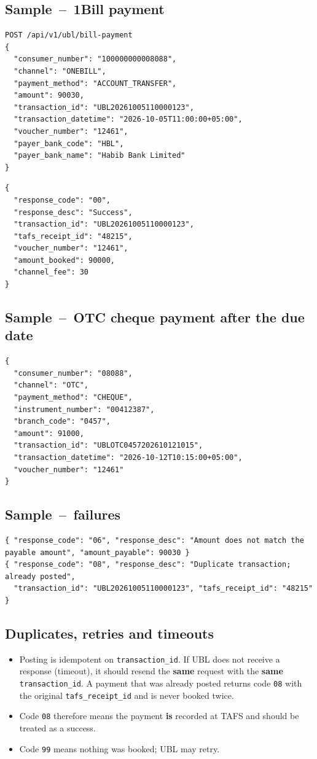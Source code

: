 \documentclass[11pt]{article}
\begin{document}
\subsection{Sample \,--\, 1Bill payment}
\begin{lstlisting}
POST /api/v1/ubl/bill-payment
{
  "consumer_number": "100000000008088",
  "channel": "ONEBILL",
  "payment_method": "ACCOUNT_TRANSFER",
  "amount": 90030,
  "transaction_id": "UBL20261005110000123",
  "transaction_datetime": "2026-10-05T11:00:00+05:00",
  "voucher_number": "12461",
  "payer_bank_code": "HBL",
  "payer_bank_name": "Habib Bank Limited"
}
\end{lstlisting}
\begin{lstlisting}
{
  "response_code": "00",
  "response_desc": "Success",
  "transaction_id": "UBL20261005110000123",
  "tafs_receipt_id": "48215",
  "voucher_number": "12461",
  "amount_booked": 90000,
  "channel_fee": 30
}
\end{lstlisting}

\subsection{Sample \,--\, OTC cheque payment after the due date}
\begin{lstlisting}
{
  "consumer_number": "08088",
  "channel": "OTC",
  "payment_method": "CHEQUE",
  "instrument_number": "00412387",
  "branch_code": "0457",
  "amount": 91000,
  "transaction_id": "UBLOTC0457202610121015",
  "transaction_datetime": "2026-10-12T10:15:00+05:00",
  "voucher_number": "12461"
}
\end{lstlisting}

\subsection{Sample \,--\, failures}
\begin{lstlisting}
{ "response_code": "06", "response_desc": "Amount does not match the payable amount", "amount_payable": 90030 }
{ "response_code": "08", "response_desc": "Duplicate transaction; already posted",
  "transaction_id": "UBL20261005110000123", "tafs_receipt_id": "48215" }
\end{lstlisting}

\subsection{Duplicates, retries and timeouts}
\begin{itemize}[nosep]
  \item Posting is idempotent on \texttt{transaction\_id}. If UBL does not receive a response (timeout), it should
        resend the \textbf{same} request with the \textbf{same} \texttt{transaction\_id}. A payment that was already posted
        returns code \texttt{08} with the original \texttt{tafs\_receipt\_id} and is never booked twice.
  \item Code \texttt{08} therefore means the payment \textbf{is} recorded at TAFS and should be treated as a success.
  \item Code \texttt{99} means nothing was booked; UBL may retry.
\end{itemize}
\end{document}
